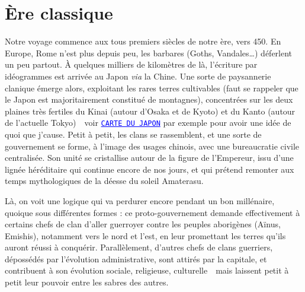 \chapter{Ère classique}


Notre voyage commence aux tous premiers siècles de notre ère, vers 450. En
Europe, Rome n'est plus depuis peu, les barbares (Goths, Vandales\dots)
déferlent un peu partout. À quelques milliers de kilomètres de là, l'écriture
par idéogrammes est arrivée au Japon \emph{via} la Chine. Une sorte de
paysannerie clanique émerge alors, exploitant les rares terres cultivables
(faut se rappeler que le Japon est majoritairement constitué de montagnes),
concentrées sur les deux plaines très fertiles du Kinai (autour d'Osaka et de
Kyoto) et du Kanto (autour de l'actuelle Tokyo)~\incise~voir
\textcolor{blue}{\underline{\texttt{CARTE DU JAPON}}} par exemple pour avoir
une idée de quoi que j'cause. Petit à petit, les clans se rassemblent, et une
sorte de gouvernement se forme, à l'image des usages chinois, avec une
bureaucratie civile centralisée. Son unité se cristallise autour de la figure
de l'Empereur, issu d'une lignée héréditaire qui continue encore de nos jours,
et qui prétend remonter aux temps mythologiques de la déesse du soleil
Amaterasu.

Là, on voit une logique qui va perdurer encore pendant un bon millénaire,
quoique sous différentes formes : ce proto-gouvernement demande effectivement à
certains chefs de clan d'aller guerroyer contre les peuples aborigènes (Aïnus,
Emishis), notamment vers le nord et l'est, en leur promettant les terres qu'ils
auront réussi à conquérir. Parallèlement, d'autres chefs de clans guerriers,
dépossédés par l'évolution administrative, sont attirés par la capitale, et
contribuent à son évolution sociale, religieuse, culturelle~\incise~mais
laissent petit à petit leur pouvoir entre les sabres des autres.

